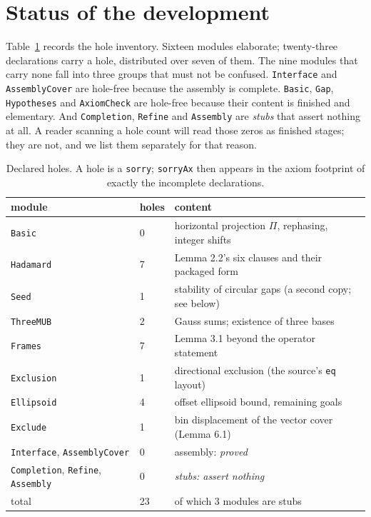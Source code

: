 \documentclass[11pt]{article}
\theoremstyle{definition}
\begin{document}
\section{Status of the development}
\label{sec:status}

Table~\ref{tab:status} records the hole inventory. Sixteen modules elaborate; twenty-three
declarations carry a hole, distributed over seven of them. The nine modules that carry none fall
into three groups that must not be confused. \texttt{Interface} and \texttt{AssemblyCover} are
hole-free because the assembly is complete. \texttt{Basic}, \texttt{Gap}, \texttt{Hypotheses} and
\texttt{AxiomCheck} are hole-free because their content is finished and elementary. And \texttt{Completion}, \texttt{Refine} and \texttt{Assembly} are \emph{stubs} that
assert nothing at all. A reader scanning a hole count will read those zeros as finished stages;
they are not, and we list them separately for that reason.

\begin{table}[ht]
\centering
\small
\begin{tabular}{@{}llp{7.4cm}@{}}
\toprule
module & holes & content \\
\midrule
\texttt{Basic} & 0 & horizontal projection $\Pi$, rephasing, integer shifts \\
\texttt{Hadamard} & 7 & Lemma 2.2's six clauses and their packaged form \\
\texttt{Seed} & 1 & stability of circular gaps (a second copy; see below) \\
\texttt{ThreeMUB} & 2 & Gauss sums; existence of three bases \\
\texttt{Frames} & 7 & Lemma 3.1 beyond the operator statement \\
\texttt{Exclusion} & 1 & directional exclusion (the source's \texttt{eq} layout) \\
\texttt{Ellipsoid} & 4 & offset ellipsoid bound, remaining goals \\
\texttt{Exclude} & 1 & bin displacement of the vector cover (Lemma 6.1) \\
\texttt{Interface}, \texttt{AssemblyCover} & 0 & assembly: \emph{proved} \\
\texttt{Completion}, \texttt{Refine}, \texttt{Assembly} & 0 & \emph{stubs: assert nothing} \\
\midrule
total & 23 & of which 3 modules are stubs \\
\bottomrule
\end{tabular}
\caption{Declared holes. A hole is a \texttt{sorry}; \texttt{sorryAx} then appears in the axiom
footprint of exactly the incomplete declarations.}
\label{tab:status}
\end{table}
\end{document}
